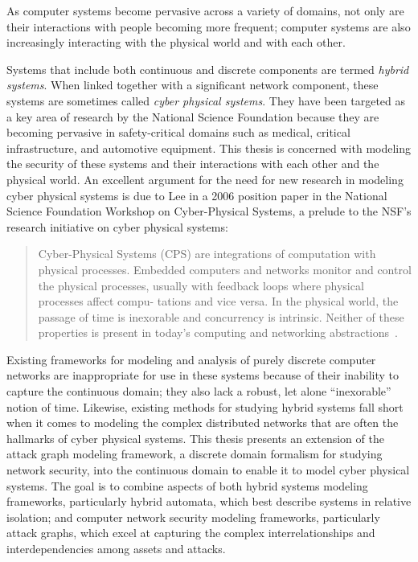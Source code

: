 As computer systems become pervasive across a variety of domains, not only are their interactions
with people becoming more frequent; computer systems are also increasingly interacting with the 
physical world and with each other.

Systems that include both continuous and discrete components are termed \emph{hybrid systems}.
When linked together with a significant network component, these systems are sometimes called
\emph{cyber physical systems}. They have been targeted as a key area of research by the National
Science Foundation because they
are becoming pervasive in safety-critical domains such as medical, critical infrastructure, and
automotive equipment. This thesis is concerned with modeling the security of these systems and
their interactions with each other and the physical world.
An excellent argument for the need for new research in modeling cyber physical systems
is due to Lee in a 2006 position paper in the National Science Foundation Workshop on Cyber-Physical Systems,
a prelude to the NSF's research initiative on cyber physical systems:
\begin{quote}
Cyber-Physical Systems (CPS) are integrations of computation with physical
processes. Embedded computers and networks monitor and control the physical
processes, usually with feedback loops where physical processes affect compu-
tations and vice versa. In the physical world, the passage of time is inexorable
and concurrency is intrinsic. Neither of these properties is present in today's
computing and networking abstractions~\cite{lee2006cyber}.
\end{quote}

Existing frameworks for modeling and analysis of purely discrete computer networks are inappropriate for use in
these systems because of their inability to capture the continuous domain; they
also lack a robust, let alone ``inexorable'' notion of time. Likewise, existing
methods for studying hybrid systems fall short when it comes to modeling the complex distributed
networks that are often the hallmarks of cyber physical systems.
This thesis presents an extension of the attack graph modeling framework, 
a discrete domain formalism for studying network security, into the 
continuous domain to enable it to model cyber
physical systems. The goal is to combine aspects of both hybrid systems
modeling frameworks, particularly hybrid automata, which best describe systems in 
relative isolation; and computer network security modeling frameworks, particularly attack graphs,
which excel at capturing the complex interrelationships and interdependencies among assets and
attacks.

